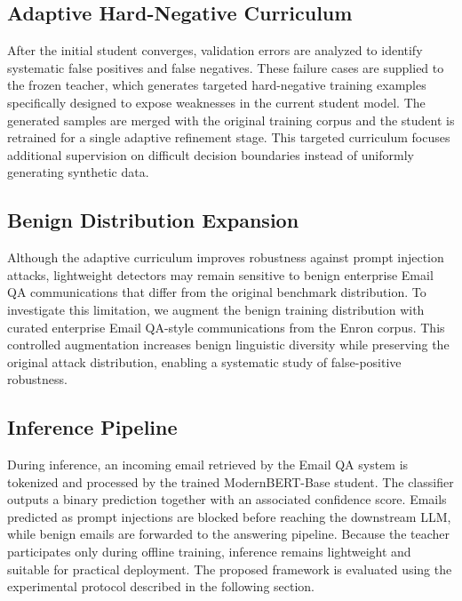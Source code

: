 \documentclass[conference]{IEEEtran}
\begin{document}
\subsection{Adaptive Hard-Negative Curriculum}

After the initial student converges, validation errors are analyzed to identify systematic false
positives and false negatives. These failure cases are supplied to the frozen teacher, which
generates targeted hard-negative training examples specifically designed to expose weaknesses in the
current student model. The generated samples are merged with the original training corpus and the
student is retrained for a single adaptive refinement stage. This targeted curriculum focuses
additional supervision on difficult decision boundaries instead of uniformly generating synthetic
data.

\subsection{Benign Distribution Expansion}

Although the adaptive curriculum improves robustness against prompt injection attacks, lightweight
detectors may remain sensitive to benign enterprise Email QA communications that differ from the
original benchmark distribution. To investigate this limitation, we augment the benign training
distribution with curated enterprise Email QA-style communications from the Enron corpus. This
controlled augmentation increases benign linguistic diversity while preserving the original attack
distribution, enabling a systematic study of false-positive robustness.

\subsection{Inference Pipeline}

During inference, an incoming email retrieved by the Email QA system is tokenized and processed by
the trained ModernBERT-Base student. The classifier outputs a binary prediction together with an
associated confidence score. Emails predicted as prompt injections are blocked before reaching the
downstream LLM, while benign emails are forwarded to the answering pipeline. Because the teacher
participates only during offline training, inference remains lightweight and suitable for practical
deployment. The proposed framework is evaluated using the experimental protocol described in the
following section.
\end{document}
